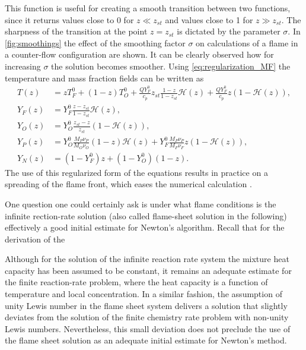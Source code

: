 This function is useful for creating a smooth transition between two functions, since it returns values close to 0 for $z \ll z_{st}$ and values close to 1 for $z \gg z_{st}$. The sharpness of the transition at the point $z = z_{st}$ is dictated by the parameter $\sigma$. In \cref{fig:smoothings} the effect of the smoothing factor $\sigma$ on calculations of a flame in a counter-flow configuration are shown. It can be clearly observed how for increasing $\sigma$ the solution becomes smoother. Using \cref{eq:regularization_MF} the temperature and mass fraction fields can be written as
\begin{subequations}
	\begin{align}
		T(z)   & = z T_F^0 + (1-z)T_O^0 + \frac{Q Y_F^0}{c_p} z_{st}\frac{1- z}{1-z_{st}}\mathcal{H}(z) +  \frac{Q Y_F^0}{c_p}z\left(1-\mathcal{H}(z)\right),  \label{eq:BS-TR} \\[1ex]
		Y_F(z) & = Y_F^0\frac{z - z_{st}}{1-z_{st}} \mathcal{H}(z), \label{eq:BS-YFR}                                                                                           \\[1ex]
		Y_O(z) & = Y_O^0 \frac{z_{st}-z}{z_{st}} (1-\mathcal{H}(z)), \label{eq:BS-YOR}                                                                                          \\[1ex]
		Y_P(z) & =  Y_O^0\frac{M_P\nu_P}{M_O\nu_O}(1-z)\mathcal{H}(z) +	Y_F^0\frac{M_P\nu_P}{M_F\nu_F}z (1-\mathcal{H}(z)), \label{eq:BS-YPR}                                   \\[1ex]
		Y_N(z) & = (1-Y_F^0)z + (1-Y_O^0)(1-z). \label{eq:BS-YNR}
	\end{align}
\end{subequations}
The use of this regularized form of the equations results in practice on a spreading of the flame front, which eases the numerical calculation \citep{braackAdaptiveFiniteElement1997}.


One question one could certainly ask is under what flame conditions is the infinite rection-rate solution (also called flame-sheet solution in the following) effectively a good initial estimate for Newton's algorithm.  Recall that for the derivation of the 

Although for the solution of the infinite reaction rate system the mixture heat capacity has been assumed to be constant, it remains an adequate estimate for the finite reaction-rate problem, where the heat capacity is a function of temperature and local concentration. In a similar fashion, the assumption of unity Lewis number in the flame sheet system delivers a solution that slightly deviates from the solution of the finite chemistry rate problem with non-unity Lewis numbers. Nevertheless, this small deviation does not preclude the use of the flame sheet solution as an adequate initial estimate for Newton's method. 

